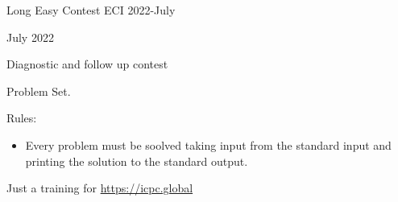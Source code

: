 \documentclass[12pt,fleqn]{article}
\begin{document}
 

  \setcounter{page}{0}

  \begin{center}
    {\huge \vspace{1.5in} Long Easy Contest ECI 2022-July\\ 
      \vspace{0.2in}}
    \par
  \end{center}

  \vspace{0.3in}

  \begin{center}
    {\Large 
      July 2022
    }
    \par
  \end{center}

  \begin{center}
    {\huge \vspace{1in} Diagnostic and follow up contest}
    \par
  \end{center}

  \begin{center}
    Problem Set.
 
    \par 

  \end{center} 

  \customtoc
  \vfill{}
  
	\newpage
	
	Rules:
	
\begin{itemize}	
  \item Every problem must be soolved taking input from the standard input and printing the solution to the standard output.
\end{itemize}
	
	
	
	
	\begin{center}
    Just a training for \url{https://icpc.global}
  \end{center}
	
  \pagebreak

	
	
	
	
	
	
	
	
	
	
	
	
	
	
	
	

  
 
\end{document}
